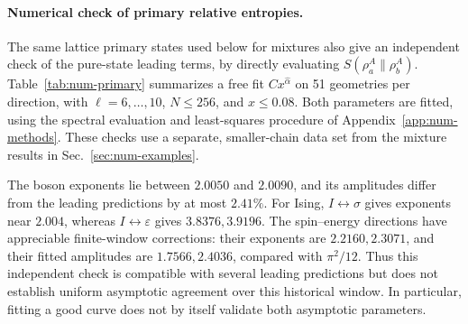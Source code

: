 \clearpage
\paragraph{Numerical check of primary relative entropies.}
The same lattice primary states used below for mixtures also give
an independent check of the pure-state leading terms, by directly
evaluating $S(\rho_a^A\|\rho_b^A)$.
Table~\ref{tab:num-primary} summarizes a free fit $Cx^{\widehat\alpha}$
on 51 geometries per direction, with $\ell=6,\ldots,10$,
$N\leq256$, and $x\leq0.08$. Both parameters are fitted, using
the spectral evaluation and least-squares procedure of
Appendix~\ref{app:num-methods}. These checks use a separate,
smaller-chain data set from the mixture results in
Sec.~\ref{sec:num-examples}.

The boson exponents lie between $2.0050$ and $2.0090$, and its
amplitudes differ from the leading predictions by at most $2.41\%$.
For Ising, $I\leftrightarrow\sigma$ gives exponents near $2.004$,
whereas $I\leftrightarrow\varepsilon$ gives $3.8376,3.9196$.
The spin--energy directions have appreciable finite-window
corrections: their exponents are $2.2160,2.3071$, and their fitted
amplitudes are $1.7566,2.4036$, compared with $\pi^2/12$.
Thus this independent check is compatible with several leading
predictions but does not establish uniform asymptotic agreement
over this historical window. In particular, fitting a good curve
does not by itself validate both asymptotic parameters.

\clearpage
